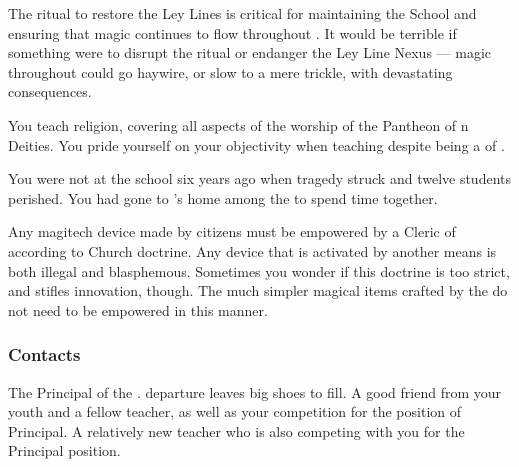 \documentclass[char]{GL2020}
\begin{document}
\begin{itemz}[Notes]
    \item The ritual to restore the Ley Lines is critical for maintaining the School and ensuring that magic continues to flow throughout \pEarth{}. It would be terrible if something were to disrupt the ritual or endanger the Ley Line Nexus — magic throughout \pEarth{} could go haywire, or slow to a mere trickle, with devastating consequences. 
    \item You teach religion, covering all aspects of the worship of the Pantheon of \pEarth{}n Deities. You pride yourself on your objectivity when teaching despite being a \cBeetle{\cleric} of \cTechGod{}.
    \item You were not at the school six years ago when tragedy struck and twelve students perished. You had gone to \cJuniorStatesman{}'s home among the \pShip{} to spend time together.
    \item Any magitech device made by \pTech{} citizens must be empowered by a Cleric of \cTechGod{} according to Church doctrine. Any device that is activated by another means is both illegal and blasphemous. Sometimes you wonder if this doctrine is too strict, and stifles innovation, though. The much simpler magical items crafted by the \pShippies{} do not need to be empowered in this manner.
\end{itemz}

\subsubsection*{Contacts}
\begin{contacts}
    \contact{\cPrincipal{}} The Principal of the \pSchool{}. \cPrincipal{\Their} departure leaves big shoes to fill.
    \contact{\cMusic{}} A good friend from your youth and a fellow teacher, as well as your competition for the position of Principal.
    \contact{\cChupSecond{}} A relatively new teacher who is also competing with you for the Principal position. 
\end{contacts}
\end{document}
